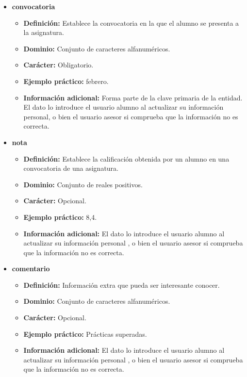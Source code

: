 \begin{description}
   \begin{itemize}
    \item \textbf{convocatoria}
     \begin{itemize}
       \item \textbf{Definición:} Establece la convocatoria en la que el
       alumno se presenta a la asignatura.
       \item \textbf{Dominio:} Conjunto de caracteres alfanuméricos.
       \item \textbf{Carácter:} Obligatorio.
       \item \textbf{Ejemplo práctico:} febrero.
       \item \textbf{Información adicional:} Forma parte de la clave primaria de
       la entidad. El dato lo introduce el usuario alumno al actualizar
       su información personal, o bien el usuario asesor si
       comprueba que la información no es correcta.
     \end{itemize}
     \item \textbf{nota}
     \begin{itemize}
       \item \textbf{Definición:} Establece la calificación obtenida por un
       alumno en una convocatoria de una asignatura.
       \item \textbf{Dominio:} Conjunto de reales positivos.
       \item \textbf{Carácter:} Opcional.
       \item \textbf{Ejemplo práctico:} 8,4.
       \item \textbf{Información adicional:} El dato lo introduce el
       usuario alumno al actualizar su información personal , o
       bien el usuario asesor si comprueba que la información no es
       correcta.
     \end{itemize}
    \item \textbf{comentario}
    \begin{itemize}
      \item \textbf{Definición:} Información extra que pueda ser
      interesante conocer.
      \item \textbf{Dominio:} Conjunto de caracteres alfanuméricos.
      \item \textbf{Carácter:} Opcional.
      \item \textbf{Ejemplo práctico:} Prácticas superadas.
      \item \textbf{Información adicional:} El dato lo introduce el
      usuario alumno al actualizar su información personal , o
      bien el usuario asesor si comprueba que la información no es
      correcta.
    \end{itemize}
   \end{itemize}


\end{description}

